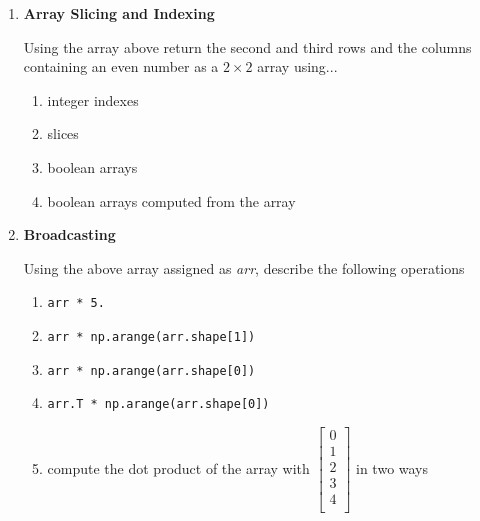 \documentclass{article}
\newcounter{points}
\newcommand\printpoints{Total number of points: \thepoints}
\begin{document}
\begin{enumerate}
\item{\textbf{Array Slicing and Indexing}}

Using the array above return the second and third rows and the columns containing an even number as a $2 \times  2$ array using... 
\begin{enumerate}
\item integer indexes
\item slices
\item boolean arrays
\item boolean arrays computed from the array
\end{enumerate}

\item \textbf{Broadcasting}

Using the above array assigned as \textit{arr}, describe the following operations

\begin{enumerate}


\item 
\begin{verbatim}
arr * 5.
\end{verbatim}


\item 
\begin{verbatim}
arr * np.arange(arr.shape[1])
\end{verbatim}

\item 
\begin{verbatim}
arr * np.arange(arr.shape[0])
\end{verbatim}


\item 
\begin{verbatim}
arr.T * np.arange(arr.shape[0])
\end{verbatim}

\item compute the dot product of the array with $\begin{bmatrix}
0\\
1\\
2\\
3\\
4\\
\end{bmatrix}$
in two ways
\end{enumerate}

\end{enumerate}
\end{document}
